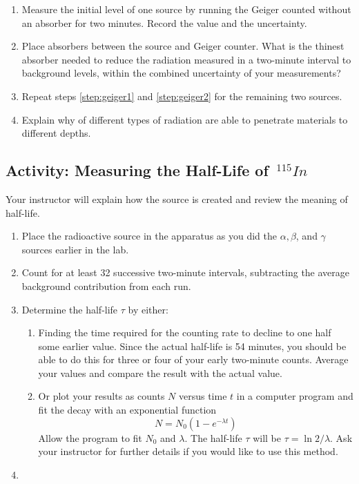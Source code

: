 \begin{enumerate}[resume]

	\item Measure the initial level of one source by running the Geiger counted without an absorber for two minutes.  Record the value and the uncertainty. \label{step:geiger1}

	\item Place absorbers between the source and Geiger counter.  What is the thinest absorber needed to reduce the radiation measured in a two-minute interval to background levels, within the combined uncertainty of your measurements? \label{step:geiger2}

	\item Repeat steps \ref{step:geiger1} and \ref{step:geiger2} for the remaining two sources.
	
	\item Explain why of different types of radiation are able to penetrate materials to different depths.

\end{enumerate}


\subsection{Activity: Measuring the Half-Life of $\,^{115}In$}

Your instructor will explain how the source is created and review the meaning of half-life.
\begin{enumerate}[resume]
	\item Place the radioactive source in the apparatus as you did the $\alpha, \beta$, and $\gamma$ sources earlier in the lab.

	\item Count for at least 32 successive two-minute intervals, subtracting the average background contribution from each run.

	\item Determine the half-life $\tau$ by either:
	\begin{enumerate}
	\item Finding the time required for the counting rate to decline to one half some earlier value. Since the actual half-life is 54 minutes, you should be able to do this for three or four of your early two-minute counts. Average your values and compare the result with the actual value.
	\item Or plot your results as counts $N$ versus time $t$ in a computer program and fit the decay with an exponential function \[N=N_{0}\left(1-e^{-\lambda t}\right)\]  Allow the program to fit $N_{0}$ and $\lambda$.  The half-life $\tau$ will be $\tau=\ln2/\lambda$.  Ask your instructor for further details if you would like to use this method.
	\end{enumerate} 
	\item
\end{enumerate}

